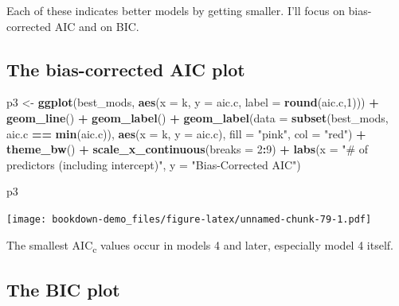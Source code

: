\documentclass[]{book}
\newenvironment{Shaded}{\begin{snugshade}}{\end{snugshade}}
\newcommand{\KeywordTok}[1]{\textcolor[rgb]{0.13,0.29,0.53}{\textbf{#1}}}
\newcommand{\DataTypeTok}[1]{\textcolor[rgb]{0.13,0.29,0.53}{#1}}
\newcommand{\DecValTok}[1]{\textcolor[rgb]{0.00,0.00,0.81}{#1}}
\newcommand{\StringTok}[1]{\textcolor[rgb]{0.31,0.60,0.02}{#1}}
\newcommand{\OperatorTok}[1]{\textcolor[rgb]{0.81,0.36,0.00}{\textbf{#1}}}
\newcommand{\NormalTok}[1]{#1}
\theoremstyle{definition}
\theoremstyle{definition}
\theoremstyle{definition}
\theoremstyle{remark}
\begin{document}
Each of these indicates better models by getting smaller. I'll focus on
bias-corrected AIC and on BIC.

\subsection{The bias-corrected AIC
plot}\label{the-bias-corrected-aic-plot}

\begin{Shaded}
\begin{Highlighting}[]
\NormalTok{p3 <-}\StringTok{ }\KeywordTok{ggplot}\NormalTok{(best_mods, }\KeywordTok{aes}\NormalTok{(}\DataTypeTok{x =}\NormalTok{ k, }\DataTypeTok{y =}\NormalTok{ aic.c,}
                             \DataTypeTok{label =} \KeywordTok{round}\NormalTok{(aic.c,}\DecValTok{1}\NormalTok{))) }\OperatorTok{+}
\StringTok{    }\KeywordTok{geom_line}\NormalTok{() }\OperatorTok{+}
\StringTok{    }\KeywordTok{geom_label}\NormalTok{() }\OperatorTok{+}
\StringTok{    }\KeywordTok{geom_label}\NormalTok{(}\DataTypeTok{data =} \KeywordTok{subset}\NormalTok{(best_mods, aic.c }\OperatorTok{==}\StringTok{ }\KeywordTok{min}\NormalTok{(aic.c)),}
               \KeywordTok{aes}\NormalTok{(}\DataTypeTok{x =}\NormalTok{ k, }\DataTypeTok{y =}\NormalTok{ aic.c), }\DataTypeTok{fill =} \StringTok{"pink"}\NormalTok{, }
               \DataTypeTok{col =} \StringTok{"red"}\NormalTok{) }\OperatorTok{+}
\StringTok{    }\KeywordTok{theme_bw}\NormalTok{() }\OperatorTok{+}
\StringTok{    }\KeywordTok{scale_x_continuous}\NormalTok{(}\DataTypeTok{breaks =} \DecValTok{2}\OperatorTok{:}\DecValTok{9}\NormalTok{) }\OperatorTok{+}
\StringTok{    }\KeywordTok{labs}\NormalTok{(}\DataTypeTok{x =} \StringTok{"# of predictors (including intercept)"}\NormalTok{,}
         \DataTypeTok{y =} \StringTok{"Bias-Corrected AIC"}\NormalTok{)}

\NormalTok{p3}
\end{Highlighting}
\end{Shaded}

\texttt{[image: bookdown-demo\_files/figure-latex/unnamed-chunk-79-1.pdf]}

The smallest AIC\textsubscript{c} values occur in models 4 and later,
especially model 4 itself.

\subsection{The BIC plot}\label{the-bic-plot}
\end{document}
